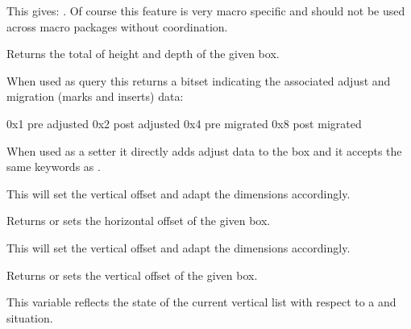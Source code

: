 \typebuffer

This gives: \inlinebuffer. Of course this feature is very macro specific and
should not be used across macro packages without coordination.

\stopnewprimitive

\startnewprimitive[title={\prm {boxtotal}}]

Returns the total of height and depth of the given box.

\stopnewprimitive

\startnewprimitive[title={\prm {boxvadjust}}]

When used as query this returns a bitset indicating the associated adjust and
migration (marks and inserts) data:

\starttabulate[|T|l|]
\NC 0x1 \NC pre  adjusted \NC \NR
\NC 0x2 \NC post adjusted \NC \NR
\NC 0x4 \NC pre  migrated \NC \NR
\NC 0x8 \NC post migrated \NC \NR
\stoptabulate

When used as a setter it directly adds adjust data to the box and it accepts the
same keywords as .

\stopnewprimitive

\startnewprimitive[title={\prm {boxxmove}}]

This will set the vertical offset and adapt the dimensions accordingly.

\stopnewprimitive

\startnewprimitive[title={\prm {boxxoffset}}]

Returns or sets the horizontal offset of the given box.

\stopnewprimitive

\startnewprimitive[title={\prm {boxymove}}]

This will set the vertical offset and adapt the dimensions accordingly.

\stopnewprimitive

\startnewprimitive[title={\prm {boxyoffset}}]

Returns or sets the vertical offset of the given box.

\stopnewprimitive

\startnewprimitive[title={\prm {breaklasthangindent}}]

This variable reflects the state of the current vertical list with respect to
a  and  situation.

\stopnewprimitive

\startnewprimitive[title={\prm {breaklasthangleftindent}}]

